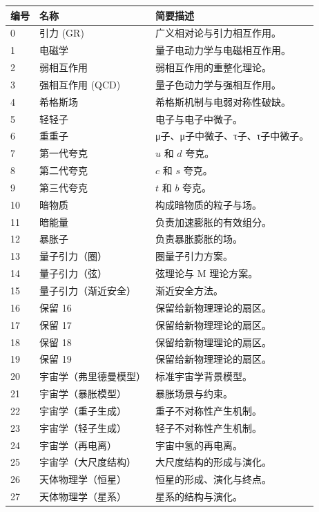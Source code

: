 \documentclass[11pt,a4paper]{article}
\begin{document}
	\begin{longtable}{|p{0.9cm}|p{6.0cm}|p{8.6cm}|}
		\hline
		\textbf{编号} & \textbf{名称} & \textbf{简要描述} \\
		\hline
		\endhead
		0 & 引力 (GR) & 广义相对论与引力相互作用。 \\
		1 & 电磁学 & 量子电动力学与电磁相互作用。 \\
		2 & 弱相互作用 & 弱相互作用的重整化理论。 \\
		3 & 强相互作用 (QCD) & 量子色动力学与强相互作用。 \\
		4 & 希格斯场 & 希格斯机制与电弱对称性破缺。 \\
		5 & 轻轻子 & 电子与电子中微子。 \\
		6 & 重重子 & μ子、μ子中微子、τ子、τ子中微子。 \\
		7 & 第一代夸克 & $u$ 和 $d$ 夸克。 \\
		8 & 第二代夸克 & $c$ 和 $s$ 夸克。 \\
		9 & 第三代夸克 & $t$ 和 $b$ 夸克。 \\
		10 & 暗物质 & 构成暗物质的粒子与场。 \\
		11 & 暗能量 & 负责加速膨胀的有效组分。 \\
		12 & 暴胀子 & 负责暴胀膨胀的场。 \\
		13 & 量子引力（圈） & 圈量子引力方案。 \\
		14 & 量子引力（弦） & 弦理论与 M 理论方案。 \\
		15 & 量子引力（渐近安全） & 渐近安全方法。 \\
		16 & 保留 16 & 保留给新物理理论的扇区。 \\
		17 & 保留 17 & 保留给新物理理论的扇区。 \\
		18 & 保留 18 & 保留给新物理理论的扇区。 \\
		19 & 保留 19 & 保留给新物理理论的扇区。 \\
		20 & 宇宙学（弗里德曼模型） & 标准宇宙学背景模型。 \\
		21 & 宇宙学（暴胀模型） & 暴胀场景与约束。 \\
		22 & 宇宙学（重子生成） & 重子不对称性产生机制。 \\
		23 & 宇宙学（轻子生成） & 轻子不对称性产生机制。 \\
		24 & 宇宙学（再电离） & 宇宙中氢的再电离。 \\
		25 & 宇宙学（大尺度结构） & 大尺度结构的形成与演化。 \\
		26 & 天体物理学（恒星） & 恒星的形成、演化与终点。 \\
		27 & 天体物理学（星系） & 星系的结构与演化。 \\

\end{longtable}
\end{document}
